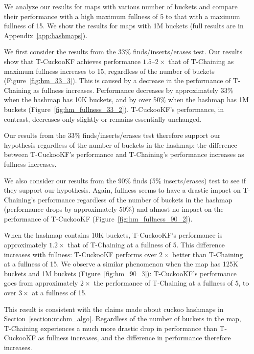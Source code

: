 We analyze our results for maps with various number of buckets and compare their performance with a high maximum fullness of 5 to that with a maximum fullness of 15. We show the results for maps with 1M buckets (full results are in Appendix~\ref{app:hashmaps}).

We first consider the results from the 33\% finds/inserts/erases test. Our results show that T-CuckooKF achieves performance $1.5$--$2\times$ that of T-Chaining as maximum fullness increases to 15, regardless of the number of buckets (Figure~\ref{fig:hm_33_3}). 
This is caused by a decrease in the performance of T-Chaining as fullness increases. Performance decreases by approximately 33\% when the hashmap has 10K buckets, and by over 50\% when the hashmap has 1M buckets (Figure~\ref{fig:hm_fullness_33_2}). T-CuckooKF's performance, in contrast, decreases only slightly or remains essentially unchanged.

Our results from the 33\% finds/inserts/erases test therefore support our hypothesis regardless of the number of buckets in the hashmap: the difference between T-CuckooKF's performance and T-Chaining's performance increases as fullness increases. 

We also consider our results from the 90\% finds (5\% inserts/erases) test to see if they support our hypothesis.
Again, fullness seems to have a drastic impact on T-Chaining's performance regardless of the number of buckets in the hashmap (performance drops by approximately 50\%) and almost no impact on the performance of T-CuckooKF (Figure~\ref{fig:hm_fullness_90_2}). 

When the hashmap contains 10K buckets, T-CuckooKF's performance is approximately $1.2\times$ that of T-Chaining at a fullness of 5. This difference increases with fullness: T-CuckooKF performs over $2\times$ better than T-Chaining at a fullness of 15.
We observe a similar phenomenon when the map has 125K buckets and 1M buckets (Figure~\ref{fig:hm_90_3}): T-CuckooKF's performance goes from approximately $2\times$ the performance of T-Chaining at a fullness of 5, to over $3\times$ at a fullness of 15.
 
This result is consistent with the claims made about cuckoo hashmaps in Section~\ref{section:ntchm_algo}. Regardless of the number of buckets in the map, T-Chaining experiences a much more drastic drop in performance than T-CuckooKF as fullness increases, and the difference in performance therefore increases.

\vspace{12pt}
\noindent{}

